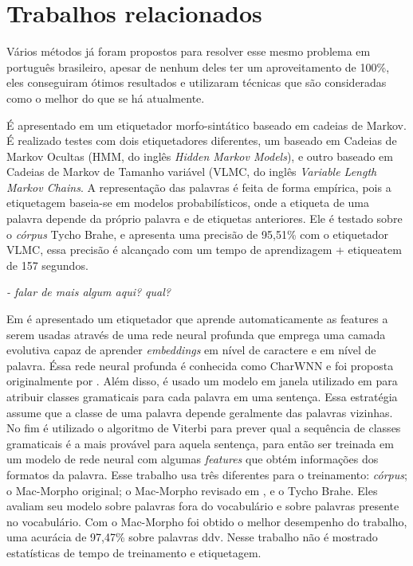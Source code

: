 \chapter{Trabalhos relacionados}\label{trabalhosrelacionados}

Vários métodos já foram propostos para resolver esse mesmo problema em português brasileiro, apesar de nenhum deles ter um aproveitamento de 100\%, eles conseguiram ótimos resultados e utilizaram técnicas que são consideradas como o melhor do que se há atualmente.

É apresentado em \cite{kepler2005etiquetador} um etiquetador morfo-sintático baseado em cadeias de Markov. É realizado testes com dois etiquetadores diferentes, um baseado em Cadeias de Markov Ocultas (HMM, do inglês \textit{Hidden Markov Models}), e outro baseado em Cadeias de Markov de Tamanho variável (VLMC, do inglês \textit{Variable Length Markov Chains}. A representação das palavras é feita de forma empírica, pois a etiquetagem baseia-se em modelos probabilísticos, onde a etiqueta de uma palavra depende da próprio palavra e de etiquetas anteriores. Ele é testado sobre o \textit{córpus} Tycho Brahe, e apresenta uma precisão de 95,51\% com o etiquetador VLMC, essa precisão é alcançado com um tempo de aprendizagem + etiqueatem de 157 segundos. 

\textit{- falar de mais algum aqui? qual?}

Em \cite{dos2014training} é apresentado um etiquetador que aprende automaticamente as features a serem usadas através de uma rede neural profunda que emprega uma camada evolutiva capaz de aprender \textit{embeddings} em nível de caractere e em nível de palavra. Éssa rede neural profunda é conhecida como CharWNN e foi proposta originalmente por . Além disso, é usado um modelo em janela utilizado em \cite{collobert2011natural} para atribuir classes gramaticais para cada palavra em uma sentença. Essa estratégia assume que a classe de uma palavra depende geralmente das palavras vizinhas. No fim é utilizado o algoritmo de Viterbi \cite{viterbi1967error} para prever qual a sequência de classes gramaticais é a mais provável para aquela sentença, para então ser treinada em um modelo de rede neural com algumas \textit{features} que obtém informações dos formatos da palavra. Esse trabalho usa três diferentes para o treinamento: \textit{córpus}; o Mac-Morpho original; o Mac-Morpho revisado em \cite{fonseca2013mac}, e o Tycho Brahe. Eles avaliam seu modelo sobre palavras fora do vocabulário e sobre palavras presente no vocabulário. Com o Mac-Morpho foi obtido o melhor desempenho do trabalho, uma acurácia de 97,47\% sobre palavras \ac{ddv}. Nesse trabalho não é mostrado estatísticas de tempo de treinamento e etiquetagem.

